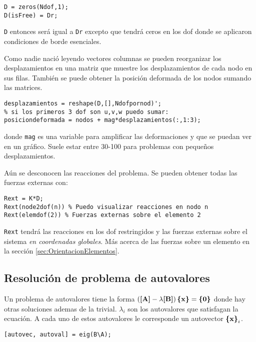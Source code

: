 \begin{lstlisting}[caption={Recuperación de desplazamientos globales.}]
D = zeros(Ndof,1);
D(isFree) = Dr;
\end{lstlisting}
\texttt{D} entonces será igual a \texttt{Dr} excepto que tendrá ceros en los dof donde se aplicaron condiciones de borde esenciales.

Como nadie nació leyendo vectores columnas se pueden reorganizar los desplazamientos en una matriz que muestre los desplazamientos de cada nodo en sus filas. También se puede obtener la posición deformada de los nodos sumando las matrices.
\begin{lstlisting}[caption={Obtención de posición deformada.}]
desplazamientos = reshape(D,[],Ndofpornod)';
% si los primeros 3 dof son u,v,w puedo sumar:
posiciondeformada = nodos + mag*desplazamientos(:,1:3); 
\end{lstlisting}
donde \texttt{mag} es una variable para amplificar las deformaciones y que se puedan ver en un gráfico. Suele estar entre 30-100 para problemas con pequeños desplazamientos.

Aún se desconocen las reacciones del problema. Se pueden obtener todas las fuerzas externas con:
\begin{lstlisting}[caption = {Obtención de reacciones.}]
Rext = K*D;
Rext(node2dof(n)) % Puedo visualizar reacciones en nodo n
Rext(elemdof(2)) % Fuerzas externas sobre el elemento 2
\end{lstlisting}
\texttt{Rext} tendrá las reacciones en los dof restringidos y las fuerzas externas sobre el sistema \textit{en coordenadas globales}. Más acerca de las fuerzas sobre un elemento en la sección \ref{sec:OrientacionElementos}.

\subsection*{Resolución de problema de autovalores}
Un problema de autovalores tiene la forma $\left(\boldsymbol{[}\mathbf{A} \boldsymbol{]} - \lambda \boldsymbol{[}\mathbf{B} \boldsymbol{]} \right) \boldsymbol{\{ }\mathbf{x} \boldsymbol{\}} = \boldsymbol{\{ }\mathbf{0} \boldsymbol{\}}$ donde hay otras soluciones ademas de la trivial. $\lambda_i$ son los autovalores que satisfagan la ecuación. A cada uno de estos autovalores le corresponde un autovector $\boldsymbol{\{ }\mathbf{x} \boldsymbol{\}}_i$.

\begin{lstlisting}[caption={Resolución de problema de autovalores}]
[autovec, autoval] = eig(B\A);
\end{lstlisting}